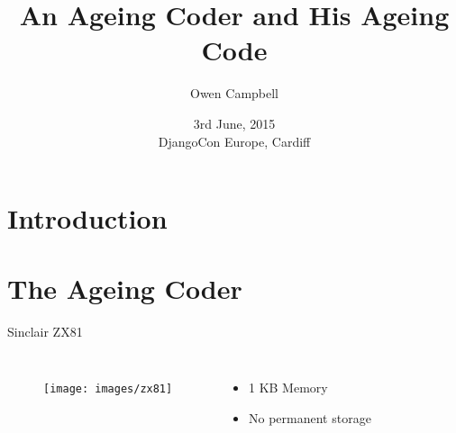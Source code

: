 \documentclass{beamer}
\title{An Ageing Coder and His Ageing Code}
\author{Owen Campbell}
\date[DjangoCon Europe 2015]{3rd June, 2015\\DjangoCon Europe, Cardiff}
\begin{document}
\begin{frame}
  \titlepage{}
\end{frame}

\section{Introduction}

\section{The Ageing Coder}

  \begin{frame}{Sinclair ZX81}
    \begin{columns}
        \begin{figure}
          \texttt{[image: images/zx81]}
        \end{figure}
        \begin{itemize}
          \item 1 KB Memory
          \item No permanent storage
        \end{itemize}
    \end{columns}
  \end{frame}
\end{document}
